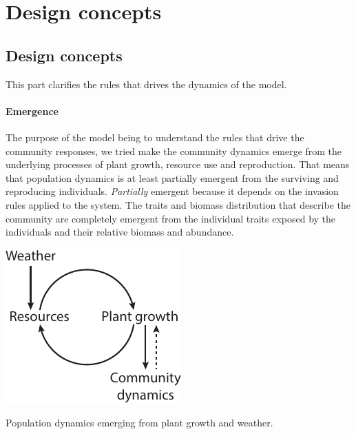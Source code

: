 \section{Design concepts}

\subsection{Design concepts}
This part clarifies the rules that drives the dynamics of the model.

\paragraph{Emergence} 
The purpose of the model being to understand the rules that drive the community responses, we tried make the community dynamics emerge from the underlying processes of plant growth, resource use and reproduction. That means that population dynamics is at least partially emergent from the surviving and reproducing individuals.
\textit{Partially} emergent because it depends on the invasion rules applied to the system. The traits and biomass distribution that describe the community are completely emergent from the individual traits exposed by the individuals and their relative biomass and abundance.
\begin{marginfigure}
\includegraphics{./Figures/emergence.pdf}
\caption{Population dynamics emerging from plant growth and weather.}
\end{marginfigure}

